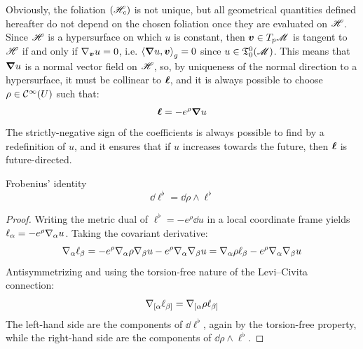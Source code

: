 Obviously, the foliation $ (\mathscr{H}_c) $ is not unique, but all geometrical quantities defined hereafter do not depend on the chosen foliation once they are evaluated on $ \mathscr{H} $. Since $ \mathscr{H} $ is a hypersurface on which $ u $ is constant, then $ \boldsymbol{v} \in T_p\mathscr{M} $ is tangent to $ \mathscr{H} $ if and only if $ \nabla_{\boldsymbol{v}} u = 0 $, i.e. $ \braket{\boldsymbol{\nabla} u , \boldsymbol{v}}_g = 0 $ since $ u \in \mathfrak{T}^{0}_{0}(\mathscr{M}) $. This means that $ \boldsymbol{\nabla} u $ is a normal vector field on $ \mathscr{H} $, so, by uniqueness of the normal direction to a hypersurface, it must be collinear to $ \boldsymbol{\ell} $, and it is always possible to choose $ \rho \in \mathcal{C}^{\infty}(U) $ such that:
\begin{equation}
  \boldsymbol{\ell} = - e^\rho \boldsymbol{\nabla} u
  \label{eq:frobenius-aux}
\end{equation}
The strictly-negative sign of the coefficients is always possible to find by a redefinition of $ u $, and it ensures that if $ u $ increases towards the future, then $ \boldsymbol{\ell} $ is future-directed.

\begin{lemma}[before upper = {\tcbtitle}]{Frobenius' identity}{}
  \begin{equation}
    \dd \ell^\flat = \dd \rho \wedge \ell^\flat
    \label{eq:frobenius}
  \end{equation}
\end{lemma}

\begin{proofbox}
  \begin{proof}
    Writing the metric dual of  $ \ell^\flat = - e^\rho \dd u $ in a local coordinate frame yields $ \ell_\alpha = - e^\rho \nabla_\alpha u $. Taking the covariant derivative:
    \begin{equation*}
      \nabla_\alpha \ell_\beta = - e^\rho \nabla_\alpha \rho \nabla_\beta u - e^\rho \nabla_\alpha \nabla_\beta u = \nabla_\alpha \rho \ell_\beta - e^\rho \nabla_\alpha \nabla_\beta u
    \end{equation*}
    Antisymmetrizing and using the torsion-free nature of the Levi--Civita connection:
    \begin{equation}
      \nabla_{[\alpha} \ell_{\beta]} = \nabla_{[\alpha} \rho \ell_{\beta]}
      \label{eq:frobenius-components}
    \end{equation}
    The left-hand side are the components of $ \dd \ell^\flat $, again by the torsion-free property, while the right-hand side are the components of $ \dd \rho \wedge \ell^\flat $.
  \end{proof}
\end{proofbox}

